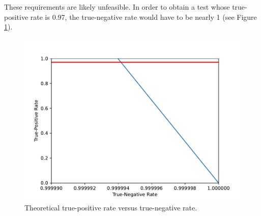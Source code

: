 These requirements are likely unfeasible. In order to obtain a test whose true-positive rate is 0.97, the true-negative rate would have to be nearly 1 (see Figure \ref{fig:tpr}).

\begin{figure}[H]
    \centering
    \includegraphics[width=0.8\linewidth]{images/tpr.pdf}
    \caption{Theoretical true-positive rate versus true-negative rate.}
    \label{fig:tpr}
\end{figure}

